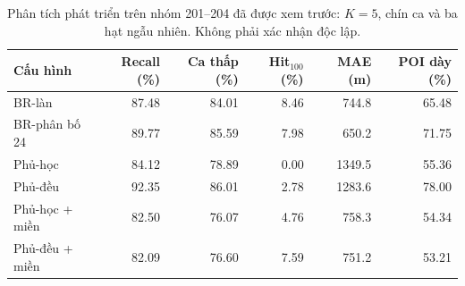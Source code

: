 \begin{table}[htbp]
\centering\small
\caption{Phân tích phát triển trên nhóm 201--204 đã được xem trước: $K=5$, chín ca và ba hạt ngẫu nhiên. Không phải xác nhận độc lập.}
\label{tab:recovery-main}
\setlength{\tabcolsep}{4pt}
\begin{tabular}{lrrrrr}
\toprule
Cấu hình & Recall (\%) & Ca thấp (\%) & Hit$_{100}$ (\%) & MAE (m) & POI dày (\%) \\
\midrule
BR-làn & 87.48 & 84.01 & 8.46 & 744.8 & 65.48 \\
BR-phân bố 24 & 89.77 & 85.59 & 7.98 & 650.2 & 71.75 \\
Phủ-học & 84.12 & 78.89 & 0.00 & 1349.5 & 55.36 \\
Phủ-đều & 92.35 & 86.01 & 2.78 & 1283.6 & 78.00 \\
Phủ-học + miền & 82.50 & 76.07 & 4.76 & 758.3 & 54.34 \\
Phủ-đều + miền & 82.09 & 76.60 & 7.59 & 751.2 & 53.21 \\
\bottomrule
\end{tabular}
\end{table}
